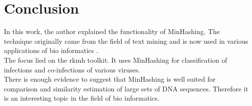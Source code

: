 \section{Conclusion}

In this work, the author explained the functionality of MinHashing. The technique originally came from the field of text mining and is now used in various applications of bio informatics \cite{rkmh, mash, sourmash}.\\

The focus lied on the rkmh toolkit. It uses MinHashing for classification of infections and co-infections of various viruses.\\

There is enough evidence to suggest that MinHashing is well suited for comparison and similarity estimation of large sets of DNA sequences. Therefore it is an interesting topic in the field of bio informatics.\\